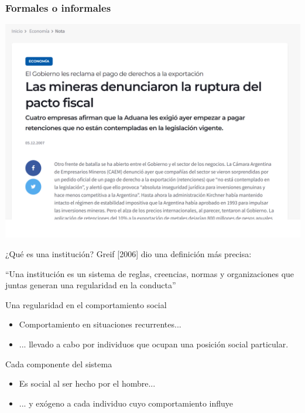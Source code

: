 \documentclass{beamer}
\begin{document}
\begin{frame}
\frametitle{Formales o informales}
\centering
\includegraphics[scale=0.4]{../Figures/Mina2.png}
\end{frame}


\begin{frame}{¿Qué es una institución?}
    Greif [2006] dio una definición más precisa:
        \begin{boxA}
            \centering
            ``Una institución es un sistema de reglas, creencias, normas y organizaciones que juntas generan una regularidad en la conducta''\vspace{2mm}
        \end{boxA}
    Una regularidad en el comportamiento social 
        \begin{itemize}
            \item Comportamiento en situaciones recurrentes...
            \item ... llevado a cabo por individuos que ocupan una posición social particular.\vspace{2mm}
        \end{itemize}
    Cada componente del sistema
        \begin{itemize}
            \item Es social al ser hecho por el hombre...
            \item ... y exógeno a cada individuo cuyo comportamiento influye
        \end{itemize}
\end{frame}
\end{document}
